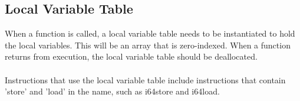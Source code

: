 \documentclass[12pt]{article}
\begin{document}
		\subsection{Local Variable Table}
			When a function is called, a local variable table needs to be instantiated to hold the local variables. This will be an array that is zero-indexed. When a function returns from execution, the local variable table should be deallocated. \\ \\
			Instructions that use the local variable table include instructions that contain 'store' and 'load' in the name, such as \colorbox{code}{i64store} and \colorbox{code}{i64load}.
		
\end{document}
